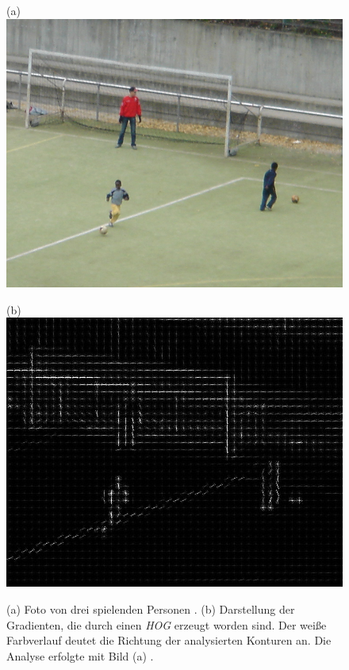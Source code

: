 
\begin{figure}[H]
	\centering
	\begin{minipage}[b]{0.47\textwidth}
		(a)
		\includegraphics[width=\textwidth]{Bilder/hog1crop.png}
	\end{minipage}
	\hfill
	\begin{minipage}[b]{0.47\textwidth}
		(b)
		\includegraphics[width=\textwidth]{Bilder/hog2crop.jpg}
	\end{minipage}
	\caption{(a) Foto von drei spielenden Personen \cite{inria1}. (b) Darstellung der Gradienten, die durch einen \textit{HOG} erzeugt worden sind. Der weiße Farbverlauf deutet die Richtung der analysierten Konturen an. Die Analyse erfolgte mit Bild (a) \cite{inria1}.}
	\label{fiq: hog}
\end{figure}
